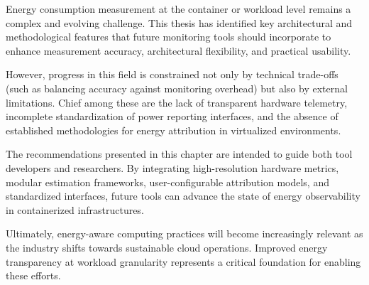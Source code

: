 Energy consumption measurement at the container or workload level remains a complex and evolving challenge. This thesis has identified key architectural and methodological features that future monitoring tools should incorporate to enhance measurement accuracy, architectural flexibility, and practical usability.

However, progress in this field is constrained not only by technical trade-offs (such as balancing accuracy against monitoring overhead) but also by external limitations. Chief among these are the lack of transparent hardware telemetry, incomplete standardization of power reporting interfaces, and the absence of established methodologies for energy attribution in virtualized environments.

The recommendations presented in this chapter are intended to guide both tool developers and researchers. By integrating high-resolution hardware metrics, modular estimation frameworks, user-configurable attribution models, and standardized interfaces, future tools can advance the state of energy observability in containerized infrastructures.

Ultimately, energy-aware computing practices will become increasingly relevant as the industry shifts towards sustainable cloud operations. Improved energy transparency at workload granularity represents a critical foundation for enabling these efforts.